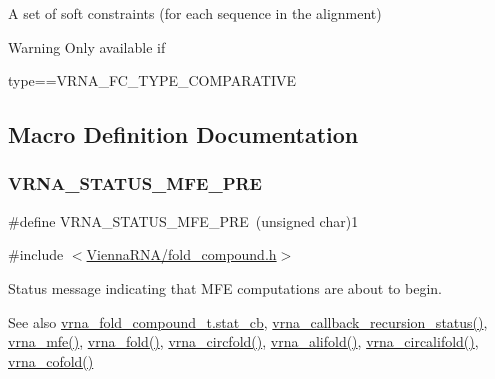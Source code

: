 A set of soft constraints (for each sequence in the alignment) 

\begin{DoxyWarning}{Warning}
Only available if\begin{DoxyVerb}type==VRNA_FC_TYPE_COMPARATIVE \end{DoxyVerb}
 
\end{DoxyWarning}


\subsection{Macro Definition Documentation}
\mbox{\label{group__fold__compound_ga1a5053dc8acbb0111e852988726f07d6}} 
\subsubsection{\texorpdfstring{V\+R\+N\+A\+\_\+\+S\+T\+A\+T\+U\+S\+\_\+\+M\+F\+E\+\_\+\+P\+RE}{VRNA\_STATUS\_MFE\_PRE}}
{\footnotesize\ttfamily \#define V\+R\+N\+A\+\_\+\+S\+T\+A\+T\+U\+S\+\_\+\+M\+F\+E\+\_\+\+P\+RE~(unsigned char)1}



{\ttfamily \#include $<$\hyperlink{fold__compound_8h}{Vienna\+R\+N\+A/fold\+\_\+compound.\+h}$>$}



Status message indicating that M\+FE computations are about to begin. 

\begin{DoxySeeAlso}{See also}
\hyperlink{group__fold__compound_a87a83f6795b569000efcbe65acc3dd81}{vrna\+\_\+fold\+\_\+compound\+\_\+t.\+stat\+\_\+cb}, \hyperlink{group__fold__compound_gac86036fa8cad1108832335063243cdc8}{vrna\+\_\+callback\+\_\+recursion\+\_\+status()}, \hyperlink{group__mfe__fold_gabd3b147371ccf25c577f88bbbaf159fd}{vrna\+\_\+mfe()}, \hyperlink{group__mfe__fold__single_ga29a33b2895f4e67b0480271ff289afdc}{vrna\+\_\+fold()}, \hyperlink{group__mfe__fold__single_gaf973483d8acbc8cc9aacfc8a9b7f0074}{vrna\+\_\+circfold()}, \hyperlink{group__consensus__mfe__fold_ga6c9d3bef3e92c6d423ffac9f981418c1}{vrna\+\_\+alifold()}, \hyperlink{group__consensus__mfe__fold_ga17a1be7490468c29c335ba9bffacba53}{vrna\+\_\+circalifold()}, \hyperlink{group__mfe__cofold_ga9ef3a297201dbf838a8daff2b45c0c82}{vrna\+\_\+cofold()} 
\end{DoxySeeAlso}
\mbox{\label{group__fold__compound_ga47c900ca76e56e59e2e83a06e0bde641}} 
